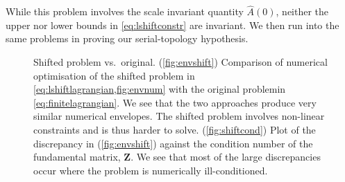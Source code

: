 \documentclass[12pt]{article}
\newcommand{\fundm}{Z}
\newcommand{\fund}{\mathbf{\fundm}}
\begin{document}
While this problem involves the scale invariant quantity \(\hat{A}(0)\), neither the upper nor lower bounds in \cref{eq:lshiftconstr} are invariant.
We then run into the same problems in proving our serial-topology hypothesis.

\begin{figure}[ht]
\begin{center}
\begin{myenuma}
  \item {}
  \label{fig:envshift}
  \item {}
  \label{fig:shiftcond}
\end{myenuma}
\caption[Shifted problem vs.\ original]{Shifted problem vs.\ original.
(\ref*{fig:envshift}) Comparison of numerical optimisation of the shifted problem in \cref{eq:lshiftlagrangian,fig:envnum} with the original problemin \cref{eq:finitelagrangian}.
We see that the two approaches produce very similar numerical envelopes.
The shifted problem involves non-linear constraints and is thus harder to solve.
(\ref{fig:shiftcond}) Plot of the discrepancy in (\ref*{fig:envshift}) against the condition number of the fundamental matrix, \(\fund \).
We see that most of the large discrepancies occur where the problem is numerically ill-conditioned.
\label{fig:shifted}}
\end{center}
\end{figure}
\end{document}
